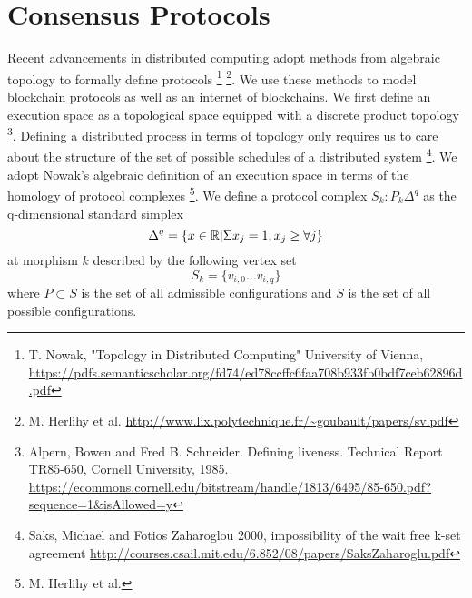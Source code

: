 \documentclass{article}
\begin{document}
\section{Consensus Protocols}
Recent advancements in distributed computing adopt methods from algebraic topology to formally define protocols 
\footnote{T. Nowak, "Topology in Distributed Computing" University of Vienna, \\
\url{https://pdfs.semanticscholar.org/fd74/ed78ccffc6faa708b933fb0bdf7ceb62896d.pdf}
}
\footnote{M. Herlihy et al. 
\url{http://www.lix.polytechnique.fr/~goubault/papers/sv.pdf}
}. 
We use these methods to model blockchain protocols as well as an internet of blockchains. 
We first define an execution space as a topological space equipped with a discrete product topology
\footnote{Alpern, Bowen and Fred B. Schneider. Defining liveness. Technical Report TR85-650, Cornell University, 1985. 
\url{https://ecommons.cornell.edu/bitstream/handle/1813/6495/85-650.pdf?sequence=1&isAllowed=y}
}. 
Defining a distributed process in terms of topology only requires us to care about the structure of the set of possible schedules of a distributed system
\footnote{Saks, Michael and Fotios Zaharoglou 2000, impossibility of the wait free k-set agreement 
\url{http://courses.csail.mit.edu/6.852/08/papers/SaksZaharoglu.pdf}
}. 
We adopt Nowak's algebraic definition of an execution space in terms of the homology of protocol complexes \footnote{M. Herlihy et al.}. We define a protocol complex $S_k: P_k {\Delta^q}$ as the q-dimensional standard simplex
\begin{equation} \label{eq1}
\Delta^q = \{x \in \mathbb{R} | \Sigma x_j = 1, x_j \geq \forall j \}
\\
\end{equation} \label{eq1}
at morphism $k$ described by the following vertex set
\begin{equation} \label{eq1}
S_k = \{v_{i,0} \dots v_{i,q}\}
\end{equation} \label{eq1}
where $P \subset S$ is the set of all admissible configurations and $S$ is the set of all possible configurations.
\end{document}
